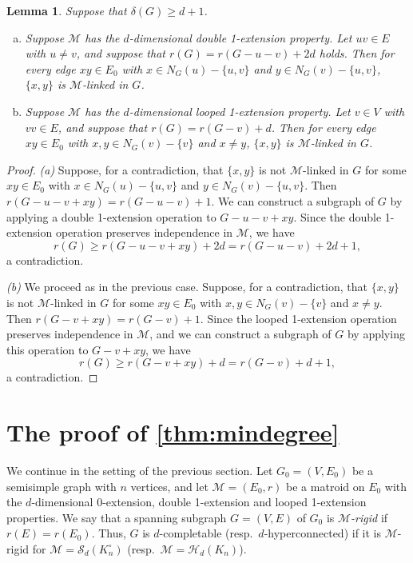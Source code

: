 \documentclass[11pt,a4paper,dvipsnames]{scrartcl}
\newtheorem{lemma}[theorem]{Lemma}
\newcommand{\cS}{{\mathcal{S}}}
\newcommand{\cH}{{\mathcal{H}}}
\newcommand{\cM}{{\mathcal{M}}}
\begin{document}
\begin{lemma}\label{lem:neighbours:clique}
    Suppose that  $\delta(G) \geq d+1$.
    \begin{enumerate}[(a)]
        \item Suppose $\cM$ has the $d$-dimensional double 1-extension property. Let $uv \in E$ with $u \neq v$, and suppose that $r(G) = r(G-u-v)+2d$ holds. Then for every edge $xy \in E_0$ with $x \in N_G(u) - \{u,v\}$ and $y \in N_G(v) - \{u,v\}$, $\{x,y\}$ is $\cM$-linked in $G$.
        \item Suppose $\cM$ has the $d$-dimensional looped 1-extension property. Let $v \in V$ with $vv \in E$, and suppose that $r(G) = r(G-v)+d$. Then for every edge $xy \in E_0$ with $x,y \in N_G(v) - \{v\}$ and $x \neq y$, $\{x,y\}$ is $\cM$-linked in $G$. 
    \end{enumerate}
\end{lemma}
\begin{proof}
    \emph{(a)} Suppose, for a contradiction, that $\{x,y\}$ is not $\cM$-linked in $G$ for some $xy\in E_0$ with $x \in N_G(u) - \{u,v\}$ and $y \in N_G(v) - \{u,v\}$. Then $r(G-u-v+xy)=r(G-u-v)+1$. We can construct a subgraph of $G$ by applying a double 1-extension operation to $G-u-v+xy$. Since the double 1-extension operation preserves independence in $\cM$, we have 
    \[r(G)\geq r(G-u-v+xy)+2d=r(G-u-v)+2d+1,\] a contradiction.
    
    \emph{(b)} We proceed as in the previous case. Suppose, for a contradiction, that $\{x,y\}$ is not $\cM$-linked in $G$ for some $xy \in E_0$ with $x,y \in N_G(v) - \{v\}$ and $x \neq y$. Then $r(G-v+xy)=r(G-v)+1$. Since the looped 1-extension operation preserves independence in $\cM$, and we can construct a subgraph of $G$ by applying this operation to $G-v+xy$, we have 
    \[r(G)\geq r(G-v+xy)+d=r(G-v)+d+1,\] a contradiction.
\end{proof}

\section{The proof of \texorpdfstring{\cref{thm:mindegree}}{Theorem 1.2}}\label{section:mindegree}

We continue in the setting of the previous section. Let $G_0=(V,E_0)$ be a semisimple graph with $n$ vertices, and let $\cM=(E_0,r)$ be a matroid on $E_0$ with the $d$-dimensional 0-extension, double 1-extension and looped 1-extension properties. We say that a spanning subgraph $G=(V,E)$ of $G_0$ is {\em $\cM$-rigid} if $r(E)=r(E_0)$. 
Thus, $G$ is $d$-completable (resp.\ $d$-hyperconnected) if it is $\cM$-rigid for $\cM = \cS_d(K_n^\circ)$ (resp.\ $\cM = \cH_d(K_n)$).
\end{document}
